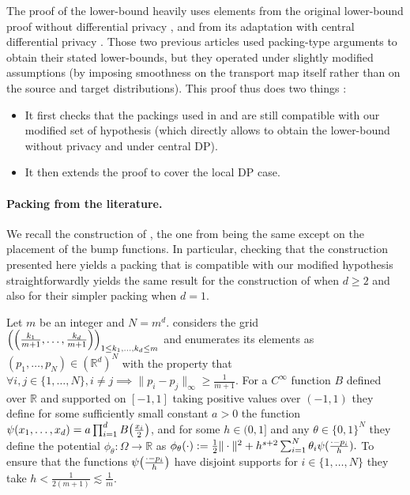 \documentclass{article}
\newcommand{\R}{\mathbb{R}}
\newcommand{\1}{\mathds{1}}
\DeclarePairedDelimiter{\paren}{\lparen}{\rparen}
\theoremstyle{plain}
\theoremstyle{definition}
\theoremstyle{remark}
\begin{document}
The proof of the lower-bound heavily uses elements from the original lower-bound proof without differential privacy \cite{hutter2021minimax}, and from its adaptation with central differential privacy \cite{lalanne2025PrivateOTMaps}.
Those two previous articles used packing-type arguments to obtain their stated lower-bounds, but they operated under slightly modified assumptions (by imposing smoothness on the transport map itself rather than on the source and target distributions). This proof thus does two things :
\begin{itemize}
    \item It first checks that the packings used in \cite{hutter2021minimax} and \cite{lalanne2025PrivateOTMaps} are still compatible with our modified set of hypothesis (which directly allows to obtain the lower-bound without privacy and under central DP).
    \item It then extends the proof to cover the local DP case.
\end{itemize}


\paragraph{Packing from the literature.}
We recall the construction of \cite{lalanne2025PrivateOTMaps}, the one from \cite{hutter2021minimax} being the same except on the placement of the bump functions. In particular, checking that the construction presented here yields a packing that is compatible with our modified hypothesis straightforwardly yields the same result for the construction of \cite{hutter2021minimax} when $d\geq 2$ and also for their simpler packing when $d=1$.

Let $m$ be an integer and $N = m^d$. 
\cite{lalanne2025PrivateOTMaps} considers the grid $\paren*{\paren*{\frac{k_1}{m+1}, \dots, \frac{k_d}{m+1}}}_{1 \leq k_1, \dots, k_d \leq m}$ and enumerates its elements as $(p_1,\dots, p_N) \in (\R^d)^N$
with the property that 
$
\forall i, j \in \{1, \dots, N \}, i \neq j \implies \| p_i - p_j\|_{\infty} \geq \frac{1}{m+1} .
$
For a $C^\infty$ function $B$ defined over $\R$ and supported on $[-1, 1]$ taking positive values over $(-1,1)$ they define for some sufficiently small constant $a>0$ the function 
$
    \psi(x_1, \dots, x_d) = a \prod_{i=1}^d B \paren*{\frac{x_i}{2}}
$,
and for some $h\in(0,1]$ and any $\theta \in \{0, 1 \}^{N}$ they define the potential $ \phi_{\theta}:{\Omega}\to\R$ as  
$
    \phi_{\theta}(\cdot) := \frac{1}{2} \| \cdot\|^2 + h^{s+2} \sum_{i = 1}^{N} \theta_i \psi \paren{\frac{\cdot - p_i}{h}} .
$
To ensure that the functions $ \psi \paren*{\frac{\cdot - p_i}{h}}$ have disjoint supports for $i \in \{1,\dots,N\}$ they take $h < \frac{1}{2(m+1)} \lesssim \frac{1}{m}$.
\end{document}
